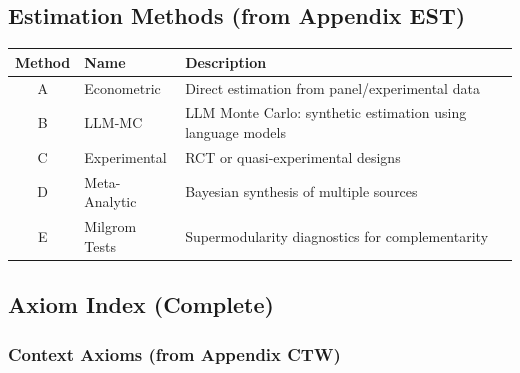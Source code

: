 \subsection{Estimation Methods (from Appendix EST)}
\label{sec:glossary-methods}

\begin{center}
\renewcommand{\arraystretch}{1.3}
\begin{tabular}{@{}clp{7cm}@{}}
\toprule
\textbf{Method} & \textbf{Name} & \textbf{Description} \\
\midrule
A & Econometric & Direct estimation from panel/experimental data \\
B & LLM-MC & LLM Monte Carlo: synthetic estimation using language models \\
C & Experimental & RCT or quasi-experimental designs \\
D & Meta-Analytic & Bayesian synthesis of multiple sources \\
E & Milgrom Tests & Supermodularity diagnostics for complementarity \\
\bottomrule
\end{tabular}
\end{center}

\subsection{Axiom Index (Complete)}
\label{sec:glossary-axioms}

\subsubsection{Context Axioms (from Appendix CTW)}

